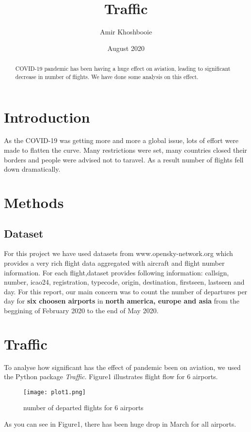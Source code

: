 \documentclass[12pt, a4paper]{article}
\title{Traffic}
\author{Amir Khoshbooie}
\date{August 2020}
\begin{document}
\begin{abstract}
COVID-19 pandemic has been having a huge effect on aviation, leading to significant decrease in number of flights. We have done some analysis on this effect.
\end{abstract}

\maketitle

\section{Introduction}
As the COVID-19 was getting more and more a global issue, lots of effort were made to flatten the curve. Many restrictions were set, many countries closed their borders and people were advised not to taravel. As a result number of flights fell down dramatically.


\section{Methods}

\subsection{Dataset}

For this project we have used datasets from www.opensky-network.org  which provides a very rich flight data aggregated with aircraft and flight number information. For each flight,dataset provides following information: callsign, number, icao24, registration, typecode, origin, destination, firstseen, lastseen and day. For this report, our main concern was to count the number of departures per day for \textbf{six choosen airports} in \textbf{north america, europe and asia} from the beggining of February 2020 to the end of May 2020.

\section{Traffic}
To analyse how significant has the effect of pandemic been on aviation, we used the Python package \emph{Traffic}.
Figure1 illustrates flight flow for 6 airports.
\newpage
\vfill
\begin{figure}[h]
    \centering
    \texttt{[image: plot1.png]}
    \caption{number of departed flights for 6 airports}
    \label{fig:mesh1}
\end{figure}
\vfill
\clearpage
As you can see in Figure1, there has been huge drop in March for all airports.
\end{document}
